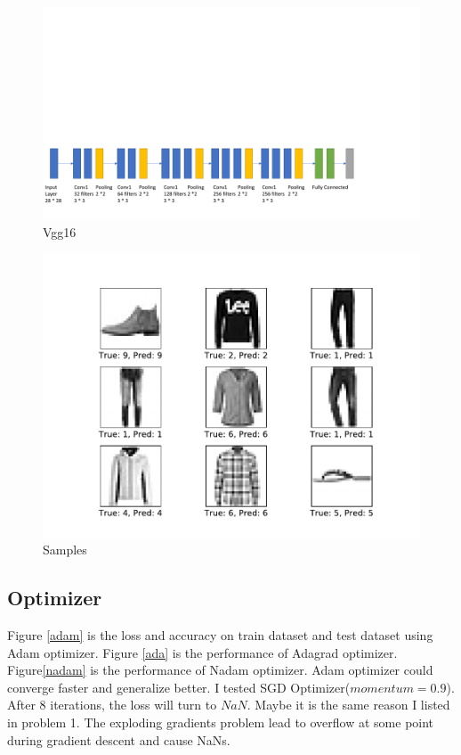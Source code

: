 \documentclass{article}
\begin{document}
\begin{figure}[!h]
  \centering
  \includegraphics[scale=0.5]{imgs/vgg.pdf}
  \caption{Vgg16}
  \label{vgg}
\end{figure}

\begin{figure}[!h]
  \centering
  \includegraphics[scale=0.4]{imgs/result.pdf}
  \caption{Samples}
  \label{res}
\end{figure}

\subsection{Optimizer}
Figure \ref{adam} is the loss and accuracy on train dataset and test dataset using Adam optimizer. Figure \ref{ada} is the performance of Adagrad optimizer. Figure\ref{nadam} is the performance of Nadam optimizer. Adam optimizer could converge faster and generalize better. I tested SGD Optimizer($momentum=0.9$). After 8 iterations, the loss will turn to $NaN$. Maybe it is the same reason I listed in problem 1. The exploding gradients problem lead to overflow at some point during gradient descent and cause NaNs.
\end{document}
